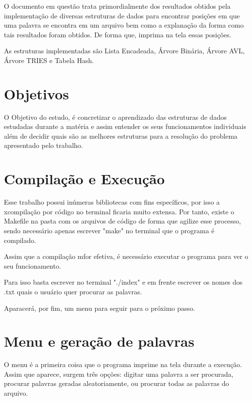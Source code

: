\documentclass[
	12pt,				%
    oneside,			%
	a4paper,			%
	english,			%
	french,				%
	spanish,			%
	brazil,				%
	]{abntex2}
\begin{document}
O documento em questão trata primordialmente dos resultados obtidos pela implementação de diversas estruturas de dados para encontrar posições em que uma palavra se encontra em um arquivo bem como a explanação da forma como tais resultados foram obtidos. De forma que, imprima na tela essas posições.

As estruturas implementadas são Lista Encadeada, Árvore Binária, Árvore AVL, Árvore TRIES e Tabela Hash.
\chapter{Objetivos} %

O Objetivo do estudo, é concretizar o aprendizado das estruturas de dados estudadas durante a matéria e assim entender os seus funcionamentos individuais além de decidir quais são as melhores estruturas para a resolução do problema apresentado pelo trabalho.



\chapter{Compilação e Execução}

    Esse trabalho possui inúmeras bibliotecas com fins específicos, por isso a xcompilação por código no terminal ficaria muito extensa. Por tanto, existe o Makefile na pasta com os arquivos de código de forma que agilize esse processo, sendo necessário apenas escrever "make" no terminal que o programa é compilado.

    Assim que a compilação mfor efetiva, é necessário executar o programa para ver o seu funcionamento.

    Para isso basta escrever no terminal "./index" e em frente escrever os nomes dos .txt quais o usuário quer procurar as palavras.

    Aparacerá, por fim, um menu para seguir para o próximo passo.


\chapter{Menu e geração de palavras}

O menu é a primeira coisa que o programa imprime na tela durante a execução. Assim que aparece, surgem três opções: digitar uma palavra a ser procurada, procurar palavras geradas aleatoriamente, ou procurar todas as palavras do arquivo.
\end{document}
